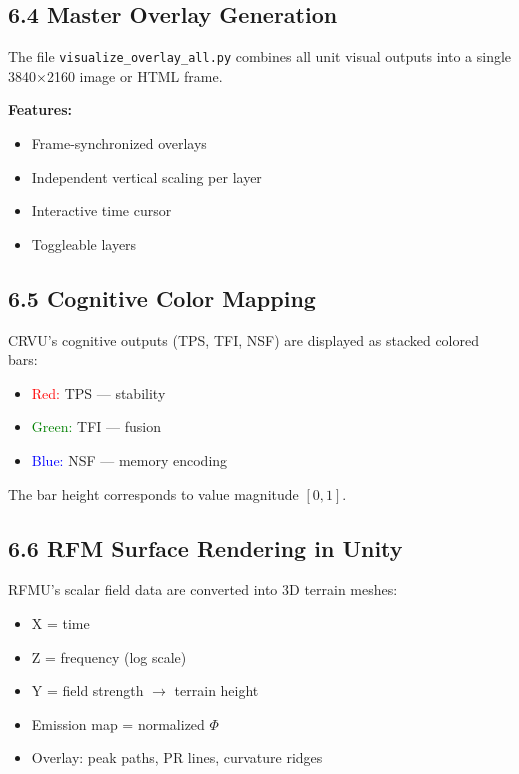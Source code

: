 \subsection*{6.4 Master Overlay Generation}

The file \texttt{visualize_overlay_all.py} combines all unit visual outputs into a single 3840×2160 image or HTML frame.

\textbf{Features:}

\begin{itemize}
    \item Frame-synchronized overlays
    \item Independent vertical scaling per layer
    \item Interactive time cursor
    \item Toggleable layers
\end{itemize}

\subsection*{6.5 Cognitive Color Mapping}

CRVU’s cognitive outputs (TPS, TFI, NSF) are displayed as stacked colored bars:

\begin{itemize}
    \item \textcolor{red}{Red:} TPS — stability
    \item \textcolor{green}{Green:} TFI — fusion
    \item \textcolor{blue}{Blue:} NSF — memory encoding
\end{itemize}

The bar height corresponds to value magnitude $[0,1]$.

\subsection*{6.6 RFM Surface Rendering in Unity}

RFMU’s scalar field data are converted into 3D terrain meshes:

\begin{itemize}
    \item X = time
    \item Z = frequency (log scale)
    \item Y = field strength $\rightarrow$ terrain height
    \item Emission map = normalized $\Phi$
    \item Overlay: peak paths, PR lines, curvature ridges
\end{itemize}

